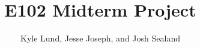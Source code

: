 \documentclass[11pt]{article}
\title{\vspace{100pt} E102 Midterm Project}
\author{Kyle Lund, Jesse Joseph, and Josh Sealand}
\begin{document}
\maketitle
\pagebreak

\end{document}
